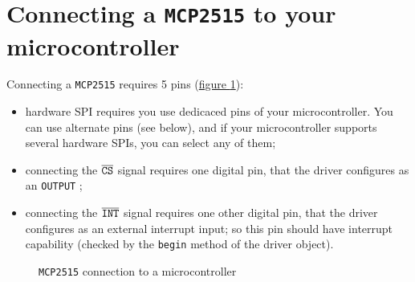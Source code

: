 \documentclass[10pt, a4paper, obeyspaces, openany]{extarticle}
\newcommand\labelFigure[1]{\label{fig:#1}}
\newcommand\refFigure[2]{\hyperref[fig:#2]{figure \ref*{fig:#2}{\ifthenelse{\equal{#1}{}}{}{.#1}}}}
\begin{document}
\section{Connecting a \texttt{MCP2515} to your microcontroller}


Connecting a \texttt{MCP2515} requires 5 pins (\refFigure{}{figureHardwareSPI}):
\begin{itemize}
  \item hardware SPI requires you use dedicaced pins of your microcontroller. You can use alternate pins (see below), and if your microcontroller supports several hardware SPIs, you can select any of them;
  \item connecting the $\overline{\tt CS}$ signal requires one digital pin, that the driver configures as an \texttt{OUTPUT} ;
  \item connecting the $\overline{\tt INT}$ signal requires one other digital pin, that the driver configures as an external interrupt input; so this pin should have interrupt capability (checked by the \texttt{begin} method of the driver object).
\end{itemize}

\begin{figure}[!ht]
  \small
  \centering
  \caption{\texttt{MCP2515} connection to a microcontroller}
  \labelFigure{figureHardwareSPI}
\end{figure}
\end{document}
